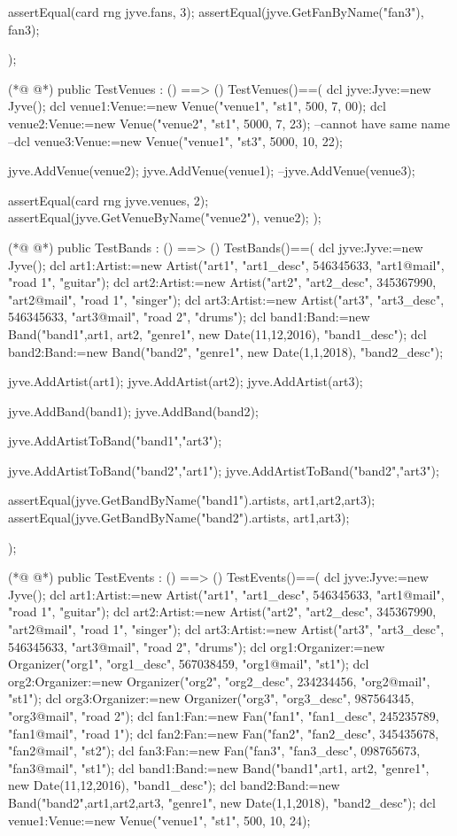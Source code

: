 \begin{vdmpp}[breaklines=true]
  assertEqual(card rng jyve.fans, 3);
  assertEqual(jyve.GetFanByName("fan3"), fan3);
  
 );
 

(*@
\label{TestVenues:68}
@*)
 public TestVenues : () ==> ()
 TestVenues()==(
  dcl jyve:Jyve:=new Jyve();
  dcl venue1:Venue:=new Venue("venue1", "st1", 500, 7, 00);
  dcl venue2:Venue:=new Venue("venue2", "st1", 5000, 7, 23);
  --cannot have same name
  --dcl venue3:Venue:=new Venue("venue1", "st3", 5000, 10, 22);
  
  jyve.AddVenue(venue2);
  jyve.AddVenue(venue1);
  --jyve.AddVenue(venue3);
  
  assertEqual(card rng jyve.venues, 2);
  assertEqual(jyve.GetVenueByName("venue2"), venue2);
 );
 
(*@
\label{TestBands:84}
@*)
 public TestBands : () ==> ()
 TestBands()==(
  dcl jyve:Jyve:=new Jyve();
  dcl art1:Artist:=new Artist("art1", "art1_desc", 546345633, "art1@mail", "road 1", "guitar");
  dcl art2:Artist:=new Artist("art2", "art2_desc", 345367990, "art2@mail", "road 1", "singer");
  dcl art3:Artist:=new Artist("art3", "art3_desc", 546345633, "art3@mail", "road 2", "drums");
  dcl band1:Band:=new Band("band1",{art1, art2}, "genre1", new Date(11,12,2016), "band1_desc");
  dcl band2:Band:=new Band("band2", "genre1", new Date(1,1,2018), "band2_desc");
  
  jyve.AddArtist(art1);
  jyve.AddArtist(art2);
  jyve.AddArtist(art3);
  
  jyve.AddBand(band1);
  jyve.AddBand(band2);
  
  jyve.AddArtistToBand("band1","art3");
  
  jyve.AddArtistToBand("band2","art1");
  jyve.AddArtistToBand("band2","art3");
  
  assertEqual(jyve.GetBandByName("band1").artists, {art1,art2,art3});
  assertEqual(jyve.GetBandByName("band2").artists, {art1,art3});
  
 );
 
(*@
\label{TestEvents:110}
@*)
 public TestEvents : () ==> ()
 TestEvents()==(
  dcl jyve:Jyve:=new Jyve();
  dcl art1:Artist:=new Artist("art1", "art1_desc", 546345633, "art1@mail", "road 1", "guitar");
  dcl art2:Artist:=new Artist("art2", "art2_desc", 345367990, "art2@mail", "road 1", "singer");
  dcl art3:Artist:=new Artist("art3", "art3_desc", 546345633, "art3@mail", "road 2", "drums");
  dcl org1:Organizer:=new Organizer("org1", "org1_desc", 567038459, "org1@mail", "st1");
  dcl org2:Organizer:=new Organizer("org2", "org2_desc", 234234456, "org2@mail", "st1");
  dcl org3:Organizer:=new Organizer("org3", "org3_desc", 987564345, "org3@mail", "road 2");
  dcl fan1:Fan:=new Fan("fan1", "fan1_desc", 245235789, "fan1@mail", "road 1");
  dcl fan2:Fan:=new Fan("fan2", "fan2_desc", 345435678, "fan2@mail", "st2");
  dcl fan3:Fan:=new Fan("fan3", "fan3_desc", 098765673, "fan3@mail", "st1");
  dcl band1:Band:=new Band("band1",{art1, art2}, "genre1", new Date(11,12,2016), "band1_desc");
  dcl band2:Band:=new Band("band2",{art1,art2,art3}, "genre1", new Date(1,1,2018), "band2_desc");
  dcl venue1:Venue:=new Venue("venue1", "st1", 500, 10, 24);
  

\end{vdmpp}
